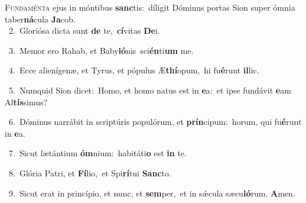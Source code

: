 \lettrine{\initial\textcolor{\initialcolor}{F}}{undaménta} ejus in móntibus \textbf{sanc}\-tis:~\star díligit Dóminus portas Sion super ómnia taber\-\textbf{ná}\-cula \textbf{Ja}\-cob.\\
{\numbfont\textcolor{\numbcolor}{~2.}}~Gloriósa dicta sunt \textbf{de} te,~\star \textbf{cí}\-vitas \textbf{De}\-i.\par
{\numbfont\textcolor{\numbcolor}{~3.}}~Memor ero Rahab, et Baby\-\textbf{ló}\-nis~\star sci\-\textbf{én}\-ti\textbf{um} me.\par
{\numbfont\textcolor{\numbcolor}{~4.}}~Ecce alienígenæ, et Tyrus, et pópulus Æ\-\textbf{thí}\-opum,~\star hi fu\-\textbf{é}\-runt \textbf{il}\-lic.\par
{\numbfont\textcolor{\numbcolor}{~5.}}~Numquid Sion dicet:~\dagger Homo, et homo natus est in \textbf{e}\-a:~\star et ipse fundávit \textbf{e}\-am Al\-\textbf{tís}\-simus?\par
{\numbfont\textcolor{\numbcolor}{~6.}}~Dóminus narrábit in scriptúris populórum, et \textbf{prín}\-cipum:~\star horum, qui fu\-\textbf{é}\-runt in \textbf{e}\-a.\par
{\numbfont\textcolor{\numbcolor}{~7.}}~Sicut lætántium \textbf{óm}\-nium:~\star habitáti\textbf{o} est \textbf{in} te.\par
{\numbfont\textcolor{\numbcolor}{~8.}}~Glória Patri, et \textbf{Fí}\-lio,~\star et Spi\-\textbf{rí}\-tui \textbf{Sanc}\-to.\par
{\numbfont\textcolor{\numbcolor}{~9.}}~Sicut erat in princípio, et nunc, et \textbf{sem}\-per,~\star et in sǽcula sæcu\-\textbf{ló}\-rum. \textbf{A}\-men.\par
